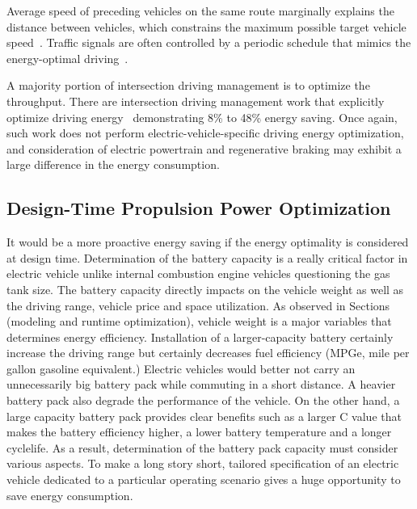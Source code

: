 Average speed of preceding vehicles on the same route marginally explains the distance between vehicles, which constrains the maximum possible target vehicle speed~\cite{Mensing:TR13,Lim:TVT17}. Traffic signals are often controlled by a periodic schedule that mimics the energy-optimal driving~\cite{Mandava:ITSC09,Asadi:TCST11,Ozatay:CDC13,Nunzio:JRNC15,Wu:ITS15}.

A majority portion of intersection driving management is to optimize the throughput. There are intersection driving management work that explicitly optimize driving energy~\cite{Nunzio:JRNC15,Wu:ITS15} demonstrating 8\% to 48\% energy saving. Once again, such work does not perform electric-vehicle-specific driving energy optimization, and consideration of electric powertrain and regenerative braking may exhibit a large difference in the energy consumption.

\subsection{Design-Time Propulsion Power Optimization} \label{subsec:propulsion_design_time_opt}

It would be a more proactive energy saving if the energy optimality is considered at design time. Determination of the battery capacity is a really critical factor in electric vehicle unlike internal combustion engine vehicles questioning the gas tank size. The battery capacity directly impacts on the vehicle weight as well as the driving range, vehicle price and space utilization. As observed in Sections (modeling and runtime optimization), vehicle weight is a major variables that determines energy efficiency. Installation of a larger-capacity battery certainly increase the driving range but certainly decreases fuel efficiency (MPGe, mile per gallon gasoline equivalent.) Electric vehicles would better not carry an unnecessarily big battery pack while commuting in a short distance. A heavier battery pack also degrade the performance of the vehicle. On the other hand, a large capacity battery pack provides clear benefits such as a larger C value that makes the battery efficiency higher, a lower battery temperature and a longer cyclelife. As a result, determination of the battery pack capacity must consider various aspects. To make a long story short, tailored specification of an electric vehicle dedicated to a particular operating scenario gives a huge opportunity to save energy consumption.


